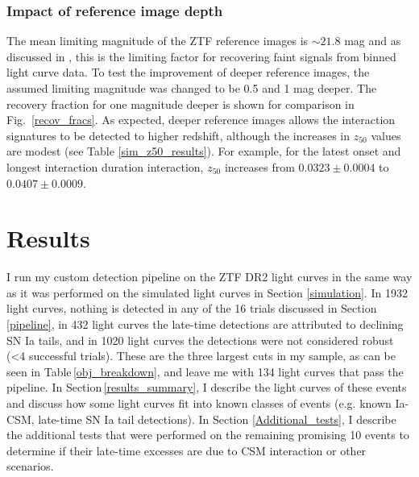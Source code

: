 \documentclass[a4paper,oneside,12pt, class=Latex/Classes/PhDthesisPSnPDF, crop=false]{standalone}
\begin{document}
\subsubsection{Impact of reference image depth}
\label{impact_refdepth}
The mean limiting magnitude of the ZTF reference images is $\sim 21.8$ mag and as discussed in \citep{ref_uncert}, this is the limiting factor for recovering faint signals from binned light curve data. To test the improvement of deeper reference images, the assumed limiting magnitude was changed to be 0.5 and 1 mag deeper. The recovery fraction for one magnitude deeper is shown for comparison in Fig.~\ref{recov_fracs}. As expected, deeper reference images allows the interaction signatures to be detected to higher redshift, although the increases in $z_{50}$ values are modest (see Table \ref{sim_z50_results}). For example, for the latest onset and longest interaction duration interaction, $z_{50}$ increases from $0.0323 \pm 0.0004$ to $0.0407 \pm 0.0009$.


\section{Results}
\label{DR2_results}
I run my custom detection pipeline on the ZTF DR2 light curves in the same way as it was performed on the simulated light curves in Section \ref{simulation}. In 1932 light curves, nothing is detected in any of the 16 trials discussed in Section \ref{pipeline}, in 432 light curves the late-time detections are attributed to declining SN Ia tails, and in 1020 light curves the detections were not considered robust (<4 successful trials). These are the three largest cuts in my sample, as can be seen in Table\,\ref{obj_breakdown}, and leave me with 134 light curves that pass the pipeline. In Section\,\ref{results_summary}, I describe the light curves of these events and discuss how some light curves fit into known classes of events (e.g. known Ia-CSM, late-time SN Ia tail detections). In Section \ref{Additional_tests}, I describe the additional tests that were performed on the remaining promising 10 events to determine if their late-time excesses are due to CSM interaction or other scenarios. 
\end{document}
